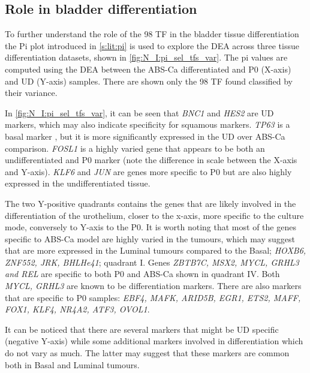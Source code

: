 \subsection{Role in bladder differentiation} \label{s:N:sel_tf_diff_status}


To further understand the role of the 98 TF in the bladder tissue differentiation the Pi plot introduced in \cref{s:lit:pi} is used to explore the \gls{DEA} across three tissue differentiation datasets, shown in \cref{fig:N_I:pi_sel_tfs_var}. The pi values are computed using the DEA between the ABS-Ca differentiated and P0 (X-axis) and UD (Y-axis) samples. There are shown only the 98 TF found classified by their variance.

In \cref{fig:N_I:pi_sel_tfs_var}, it can be seen that \textit{BNC1} and \textit{HES2} are UD markers, which may also indicate specificity for squamous markers. \textit{TP63} is a basal marker \citep{Choi2012-kk,Karni-Schmidt2011-ps, Choi2014-ed}, but it is more significantly expressed in the UD over ABS-Ca comparison. \textit{FOSL1} is a highly varied gene that appears to be both an undifferentiated and P0 marker (note the difference in scale between the X-axis and Y-axis). \textit{KLF6} and \textit{JUN} are genes more specific to P0 but are also highly expressed in the undifferentiated tissue.

The two Y-positive quadrants contains the genes that are likely involved in the differentiation of the urothelium, closer to the x-axis, more specific to the culture mode, conversely to Y-axis to the P0. It is worth noting that most of the genes specific to ABS-Ca model are highly varied in the tumours, which may suggest that are more expressed in the Luminal tumours compared to the Basal; \textit{HOXB6, ZNF552, JRK, BHLHe41}; quadrant I. Genes \textit{ZBTB7C, MSX2, MYCL, GRHL3 and REL} are specific to both P0 and ABS-Ca shown in quadrant IV. Both \textit{MYCL, GRHL3} are known to be differentiation markers. There are also markers that are specific to P0 samples: \textit{EBF4, MAFK, ARID5B, EGR1, ETS2, MAFF, FOX1, KLF4, NR4A2, ATF3, OVOL1}. 

It can be noticed that there are several markers that might be UD specific (negative Y-axis) while some additional markers involved in differentiation which do not vary as much. The latter may suggest that these markers are common both in Basal and Luminal tumours. 

